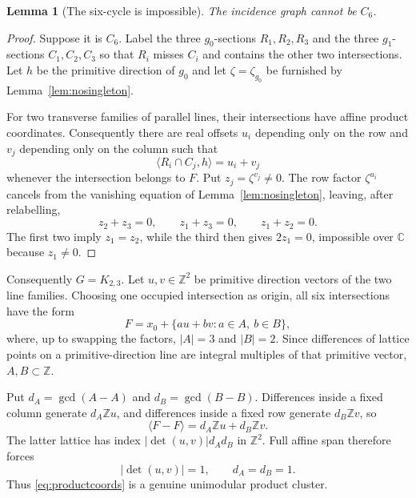 \documentclass[11pt]{article}
\newtheorem{lemma}[theorem]{Lemma}
\newcommand{\Z}{\mathbb Z}
\begin{document}
\begin{lemma}[The six-cycle is impossible]\label{lem:noc6}
The incidence graph cannot be $C_6$.
\end{lemma}
\begin{proof}
Suppose it is $C_6$. Label the three $g_0$-sections $R_1,R_2,R_3$ and the three $g_1$-sections $C_1,C_2,C_3$ so that $R_i$ misses $C_i$ and contains the other two intersections. Let $h$ be the primitive direction of $g_0$ and let $\zeta=\zeta_{g_0}$ be furnished by Lemma~\ref{lem:nosingleton}.

For two transverse families of parallel lines, their intersections have affine product coordinates. Consequently there are real offsets $u_i$ depending only on the row and $v_j$ depending only on the column such that
\[
 \langle R_i\cap C_j,h\rangle=u_i+v_j
\]
whenever the intersection belongs to $F$. Put $z_j=\zeta^{v_j}\ne0$. The row factor $\zeta^{u_i}$ cancels from the vanishing equation of Lemma~\ref{lem:nosingleton}, leaving, after relabelling,
\[
 z_2+z_3=0,\qquad z_1+z_3=0,\qquad z_1+z_2=0.
\]
The first two imply $z_1=z_2$, while the third then gives $2z_1=0$, impossible over $\mathbb C$ because $z_1\ne0$.
\end{proof}

Consequently $G=K_{2,3}$. Let $u,v\in\Z^2$ be primitive direction vectors of the two line families. Choosing one occupied intersection as origin, all six intersections have the form
\begin{equation}\label{eq:productcoords}
 F=x_0+\{a u+b v:a\in A,\ b\in B\},
\end{equation}
where, up to swapping the factors, $|A|=3$ and $|B|=2$. Since differences of lattice points on a primitive-direction line are integral multiples of that primitive vector, $A,B\subset\Z$.

Put $d_A=\gcd(A-A)$ and $d_B=\gcd(B-B)$. Differences inside a fixed column generate $d_A\Z u$, and differences inside a fixed row generate $d_B\Z v$, so
\[
 \langle F-F\rangle=d_A\Z u+d_B\Z v.
\]
The latter lattice has index $|\det(u,v)|d_A d_B$ in $\Z^2$. Full affine span therefore forces
\begin{equation}\label{eq:gcds}
 |\det(u,v)|=1,\qquad d_A=d_B=1.
\end{equation}
Thus \eqref{eq:productcoords} is a genuine unimodular product cluster.
\end{document}
